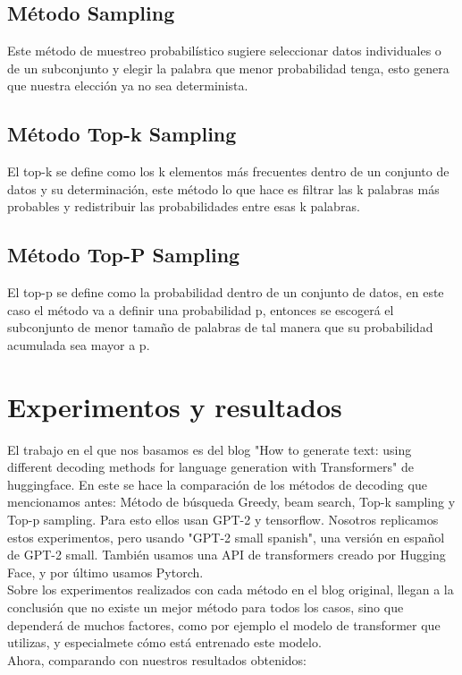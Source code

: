 \documentclass[10pt,twocolumn]{article}
\theoremstyle{definition}
\begin{document}
\subsection{Método Sampling}
Este método de muestreo probabilístico sugiere seleccionar datos individuales o de un subconjunto y elegir la palabra que menor probabilidad tenga, esto genera que nuestra elección ya no sea determinista.

\subsection{Método Top-k Sampling}
El top-k se define como los k elementos más frecuentes dentro de un conjunto de datos y su determinación, este método lo que hace es filtrar las  k palabras más probables y redistribuir las probabilidades entre esas k palabras.

\subsection{Método Top-P Sampling}
El top-p se define como la probabilidad dentro de un conjunto de datos, en este caso el método va a definir una probabilidad p, entonces se escogerá el subconjunto de menor tamaño de palabras de tal manera que su probabilidad acumulada sea mayor a p.

\section{Experimentos y resultados}
El trabajo en el que nos basamos es del blog "How to generate text: using different decoding methods for language generation with Transformers" de huggingface. En este se hace la comparación de los métodos de decoding que mencionamos antes: Método de búsqueda Greedy, beam search, Top-k sampling y Top-p sampling. Para esto ellos usan GPT-2 y tensorflow. Nosotros replicamos estos experimentos, pero usando "GPT-2 small spanish", una versión en español de GPT-2 small. También usamos una API de transformers creado por Hugging Face, y por último usamos Pytorch. \\
Sobre los experimentos realizados con cada método en el blog original, llegan a la conclusión que no existe un mejor método para todos los casos, sino que dependerá de muchos factores, como por ejemplo el modelo de transformer que utilizas, y especialmete cómo está entrenado este modelo. \\
Ahora, comparando con nuestros resultados obtenidos: \\
\end{document}
